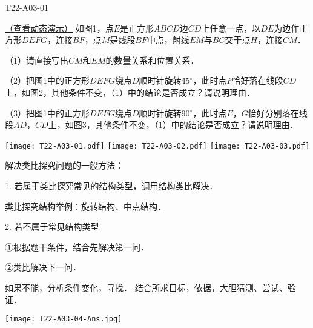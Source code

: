 
\begin{defproblem}{T22-A03-01}%
\begin{onlyproblem}%
\href{run:./ItemBankFigures/T22-A03-01.ggb}{（查看动态演示）}
如图1，点$E$是正方形$ABCD$边$CD$上任意一点，以$DE$为边作正方形$DEFG$，连接$BF$，点$M$是线段$BF$中点，射线$EM$与$BC$交于点$H$，连接$CM$．

（1）请直接写出$CM$和$EM$的数量关系和位置关系．

（2）把图1中的正方形$DEFG$绕点$D$顺时针旋转45$^{\circ }$，此时点$F$恰好落在线段$CD$上，如图2，其他条件不变，（1）中的结论是否成立？请说明理由．

（3）把图1中的正方形$DEFG$绕点$D$顺时针旋转90$^{\circ }$，此时点$E$，$G$恰好分别落在线段$AD$，$CD$上，如图3，其他条件不变，（1）中的结论是否成立？请说明理由．
\begin{center}
\texttt{[image: T22-A03-01.pdf]}\qquad
\texttt{[image: T22-A03-02.pdf]}\qquad
\texttt{[image: T22-A03-03.pdf]}
\end{center}

\end{onlyproblem}%
\begin{onlysolution}%
解决类比探究问题的一般方法：

1.	若属于类比探究常见的结构类型，调用结构类比解决．

类比探究结构举例：旋转结构、中点结构．

2.	若不属于常见结构类型

①根据题干条件，结合\underline{\hspace*{3cm}}先解决第一问．

②类比解决下一问．

如果不能，分析条件变化，寻找\underline{\hspace*{3cm}}．
结合所求目标，依据\underline{\hspace*{3cm}}，大胆猜测、尝试、验证．


\begin{center}
\texttt{[image: T22-A03-04-Ans.jpg]}
\end{center}
\end{onlysolution}%
\end{defproblem}






